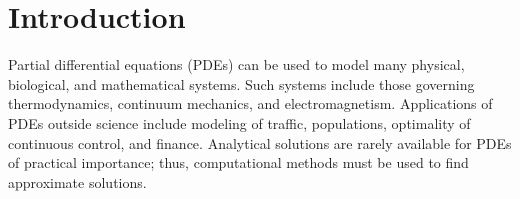 \section{Introduction}
\label{sec:metapde-intro}

Partial differential equations (PDEs) can be used to model many physical, biological, and mathematical systems. Such systems include those governing thermodynamics, continuum mechanics, and electromagnetism. Applications of PDEs outside science include modeling of traffic, populations, optimality of continuous control, and finance.
Analytical solutions are rarely available for PDEs of practical importance; thus, computational methods must be used to find approximate solutions.


